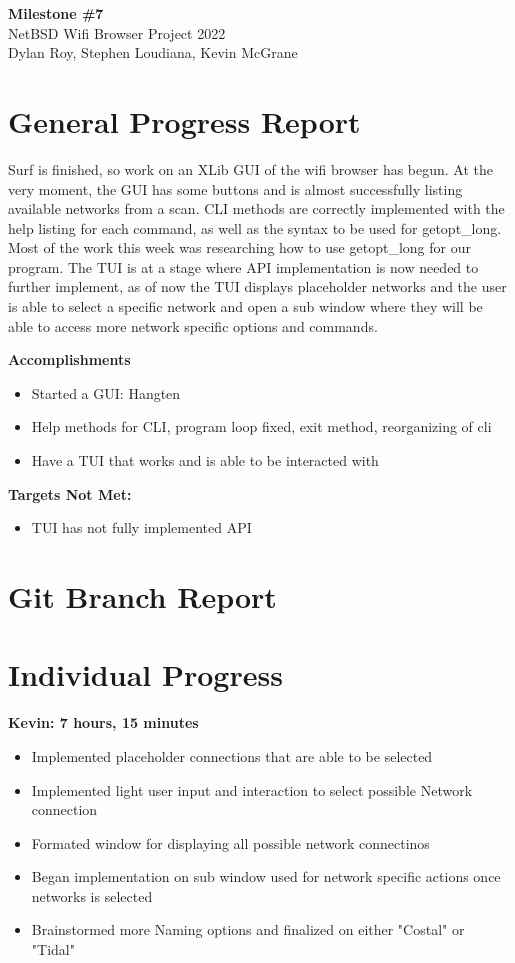 \documentclass[11pt]{article}
\begin{document}
\begin{center}
  \textbf{\Large Milestone \#7}\\\large NetBSD Wifi Browser Project 2022\\
  Dylan Roy, Stephen Loudiana, Kevin McGrane
\end{center}

\section{General Progress Report}
Surf is finished, so work on an XLib GUI of the wifi browser has begun.
At the very moment, the GUI has some buttons and is almost successfully
listing available networks from a scan. CLI methods are correctly implemented 
with the help listing for each command, as well as the syntax to be used for 
getopt_long. Most of the work this week was researching how to use getopt_long 
for our program. The TUI is at a stage where API implementation is now needed to further implement, as of now the TUI displays placeholder networks and the user is able to select a specific network and open a sub window where they will be able to access more network specific options and commands.

\textbf{Accomplishments}
\begin{itemize}
  \item Started a GUI: Hangten
  \item Help methods for CLI, program loop fixed, exit method, reorganizing of cli
  \item Have a TUI that works and is able to be interacted with
\end{itemize}

\textbf{Targets Not Met:}
\begin{itemize}
  \item TUI has not fully implemented API
\end{itemize}


\section{Git Branch Report}

\newpage
\section{Individual Progress}

\textbf{Kevin: 7 hours, 15 minutes}
\begin{itemize}
  \item Implemented placeholder connections that are able to be selected
  \item Implemented light user input and interaction to select possible Network connection
  \item Formated window for displaying all possible network connectinos
  \item Began implementation on sub window used for network specific actions once networks is selected
  \item Brainstormed more Naming options and finalized on either "Costal" or "Tidal"
\end{itemize}
\end{document}

